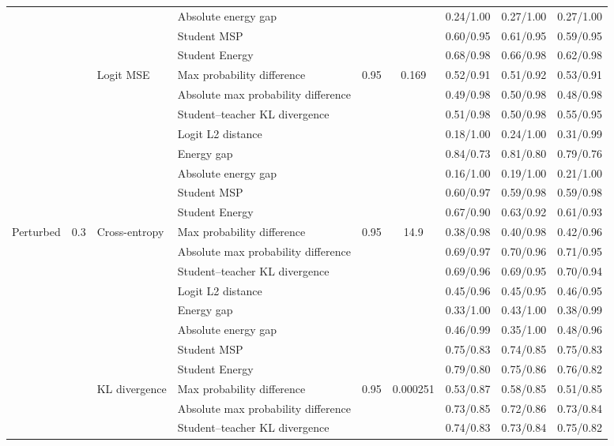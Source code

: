 \documentclass[border=2pt]{standalone}
\begin{document}
\begin{tabular}{llllccccc}
 &  &  & Absolute energy gap &  &  & 0.24/1.00 & 0.27/1.00 & 0.27/1.00 \\
 &  &  & Student MSP &  &  & 0.60/0.95 & 0.61/0.95 & 0.59/0.95 \\
 &  &  & Student Energy &  &  & 0.68/0.98 & 0.66/0.98 & 0.62/0.98 \\
\addlinespace
 &  & Logit MSE & Max probability difference & 0.95 & 0.169 & 0.52/0.91 & 0.51/0.92 & 0.53/0.91 \\
 &  &  & Absolute max probability difference &  &  & 0.49/0.98 & 0.50/0.98 & 0.48/0.98 \\
 &  &  & Student--teacher KL divergence &  &  & 0.51/0.98 & 0.50/0.98 & 0.55/0.95 \\
 &  &  & Logit L2 distance &  &  & 0.18/1.00 & 0.24/1.00 & 0.31/0.99 \\
 &  &  & Energy gap &  &  & 0.84/0.73 & 0.81/0.80 & 0.79/0.76 \\
 &  &  & Absolute energy gap &  &  & 0.16/1.00 & 0.19/1.00 & 0.21/1.00 \\
 &  &  & Student MSP &  &  & 0.60/0.97 & 0.59/0.98 & 0.59/0.98 \\
 &  &  & Student Energy &  &  & 0.67/0.90 & 0.63/0.92 & 0.61/0.93 \\
\midrule
Perturbed & 0.3 & Cross-entropy & Max probability difference & 0.95 & 14.9 & 0.38/0.98 & 0.40/0.98 & 0.42/0.96 \\
 &  &  & Absolute max probability difference &  &  & 0.69/0.97 & 0.70/0.96 & 0.71/0.95 \\
 &  &  & Student--teacher KL divergence &  &  & 0.69/0.96 & 0.69/0.95 & 0.70/0.94 \\
 &  &  & Logit L2 distance &  &  & 0.45/0.96 & 0.45/0.95 & 0.46/0.95 \\
 &  &  & Energy gap &  &  & 0.33/1.00 & 0.43/1.00 & 0.38/0.99 \\
 &  &  & Absolute energy gap &  &  & 0.46/0.99 & 0.35/1.00 & 0.48/0.96 \\
 &  &  & Student MSP &  &  & 0.75/0.83 & 0.74/0.85 & 0.75/0.83 \\
 &  &  & Student Energy &  &  & 0.79/0.80 & 0.75/0.86 & 0.76/0.82 \\
\addlinespace
 &  & KL divergence & Max probability difference & 0.95 & 0.000251 & 0.53/0.87 & 0.58/0.85 & 0.51/0.85 \\
 &  &  & Absolute max probability difference &  &  & 0.73/0.85 & 0.72/0.86 & 0.73/0.84 \\
 &  &  & Student--teacher KL divergence &  &  & 0.74/0.83 & 0.73/0.84 & 0.75/0.82 \\

\end{tabular}
\end{document}
